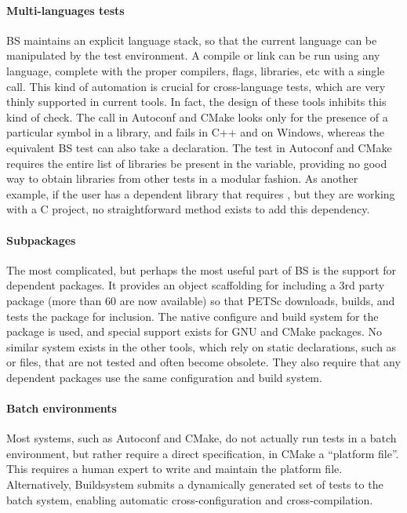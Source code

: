 {{{\paragraph{Multi-languages tests} BS maintains an explicit language stack, so that the current language can be
manipulated by the test environment. A compile or link can be run using any language, complete with the proper
compilers, flags, libraries, etc with a single call. This kind of automation is crucial for cross-language tests, which
are very thinly supported in current tools. In fact, the design of these tools inhibits this kind of check. The
 call in Autoconf and CMake looks only for the presence of a particular symbol in
a library, and fails in C++ and on Windows, whereas the equivalent BS test can also take a declaration. The
 test in Autoconf and CMake requires the entire list of libraries be present in the
 variable, providing no good way to obtain libraries from other tests in a modular fashion. As another
example, if the user has a dependent library that requires , but they are working with a C
project, no straightforward method exists to add this dependency.

\paragraph{Subpackages} The most complicated, but perhaps the most useful part of BS is the support for dependent
packages. It provides an object scaffolding for including a 3rd party package (more than 60 are now available) so that
PETSc downloads, builds, and tests the package for inclusion. The native configure and build system for the package is
used, and special support exists for GNU and CMake packages. No similar system exists in the other tools, which rely on
static declarations, such as  or  files, that are not tested and
often become obsolete. They also require that any dependent packages use the same configuration and build system.

\paragraph{Batch environments} Most systems, such as Autoconf and CMake, do not actually run tests in a batch
environment, but rather require a direct specification, in CMake a ``platform file''. This requires a human expert to
write and maintain the platform file. Alternatively, Buildsystem submits a dynamically generated set of tests to the
batch system, enabling automatic cross-configuration and cross-compilation.

}}}
